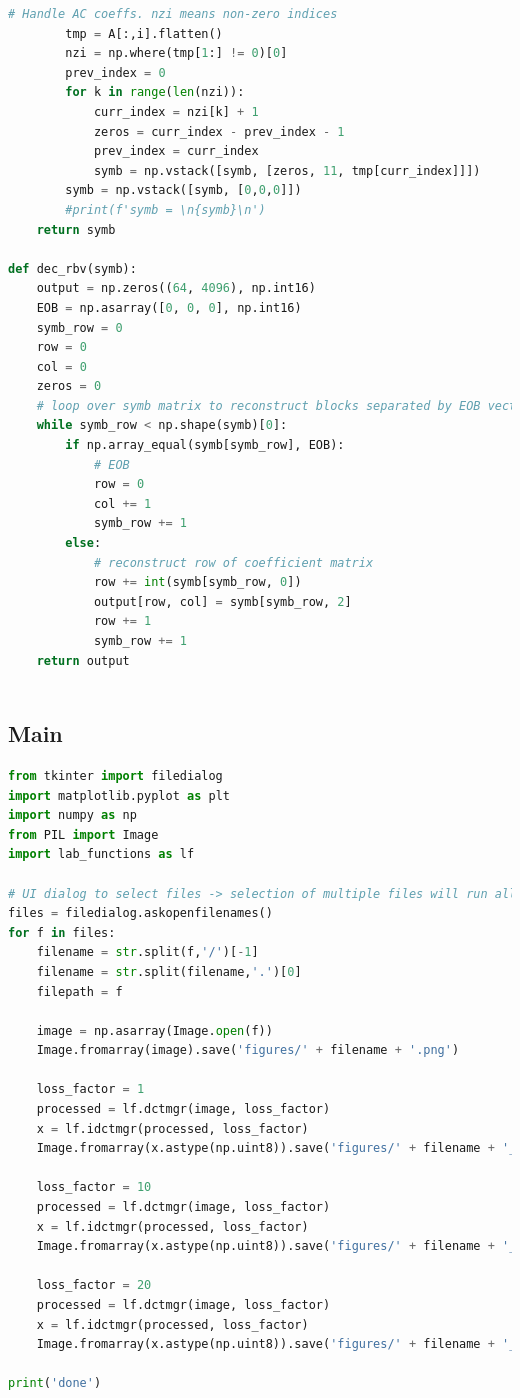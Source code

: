 \documentclass[11pt,a4paper]{article}
\begin{document}
\begin{lstlisting}[language=python]
        # Handle AC coeffs. nzi means non-zero indices
        tmp = A[:,i].flatten()
        nzi = np.where(tmp[1:] != 0)[0]
        prev_index = 0
        for k in range(len(nzi)):
            curr_index = nzi[k] + 1
            zeros = curr_index - prev_index - 1
            prev_index = curr_index
            symb = np.vstack([symb, [zeros, 11, tmp[curr_index]]])
        symb = np.vstack([symb, [0,0,0]])
        #print(f'symb = \n{symb}\n')
    return symb

def dec_rbv(symb):
    output = np.zeros((64, 4096), np.int16)
    EOB = np.asarray([0, 0, 0], np.int16)
    symb_row = 0
    row = 0
    col = 0
    zeros = 0
    # loop over symb matrix to reconstruct blocks separated by EOB vectors
    while symb_row < np.shape(symb)[0]:
        if np.array_equal(symb[symb_row], EOB):
            # EOB
            row = 0
            col += 1
            symb_row += 1
        else:
            # reconstruct row of coefficient matrix
            row += int(symb[symb_row, 0])
            output[row, col] = symb[symb_row, 2]
            row += 1
            symb_row += 1
    return output
    
\end{lstlisting}

\subsection{Main}
    \begin{lstlisting}[language=python]
from tkinter import filedialog
import matplotlib.pyplot as plt
import numpy as np
from PIL import Image
import lab_functions as lf

# UI dialog to select files -> selection of multiple files will run all functions for each file
files = filedialog.askopenfilenames()
for f in files:
    filename = str.split(f,'/')[-1]
    filename = str.split(filename,'.')[0]
    filepath = f

    image = np.asarray(Image.open(f))
    Image.fromarray(image).save('figures/' + filename + '.png')

    loss_factor = 1
    processed = lf.dctmgr(image, loss_factor)
    x = lf.idctmgr(processed, loss_factor)
    Image.fromarray(x.astype(np.uint8)).save('figures/' + filename + '_lf' + str(loss_factor) + '.png')

    loss_factor = 10
    processed = lf.dctmgr(image, loss_factor)
    x = lf.idctmgr(processed, loss_factor)
    Image.fromarray(x.astype(np.uint8)).save('figures/' + filename + '_lf' + str(loss_factor) + '.png')
    
    loss_factor = 20
    processed = lf.dctmgr(image, loss_factor)
    x = lf.idctmgr(processed, loss_factor)
    Image.fromarray(x.astype(np.uint8)).save('figures/' + filename + '_lf' + str(loss_factor) + '.png')

print('done')
\end{lstlisting}
\end{document}
